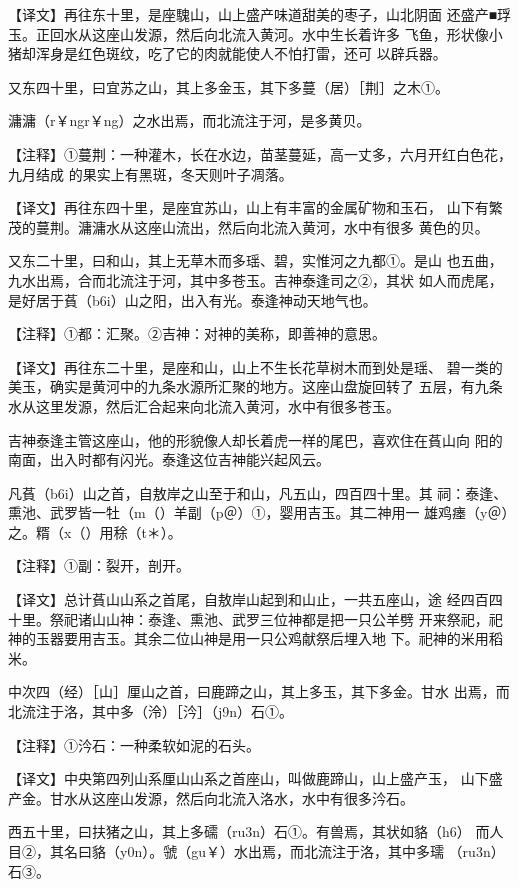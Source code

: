 \documentclass[a4paper,12pt,UTF8,twoside]{ctexbook}
\begin{document}
【译文】再往东十里，是座騩山，山上盛产味道甜美的枣子，山北阴面 还盛产■琈玉。正回水从这座山发源，然后向北流入黄河。水中生长着许多 飞鱼，形状像小猪却浑身是红色斑纹，吃了它的肉就能使人不怕打雷，还可 以辟兵器。

又东四十里，曰宜苏之山，其上多金玉，其下多蔓（居）［荆］之木①。

滽滽（r￥ngr￥ng）之水出焉，而北流注于河，是多黄贝。

【注释】①蔓荆：一种灌木，长在水边，苗茎蔓延，高一丈多，六月开红白色花，九月结成 的果实上有黑斑，冬天则叶子凋落。

【译文】再往东四十里，是座宜苏山，山上有丰富的金属矿物和玉石， 山下有繁茂的蔓荆。滽滽水从这座山流出，然后向北流入黄河，水中有很多 黄色的贝。

又东二十里，曰和山，其上无草木而多瑶、碧，实惟河之九都①。是山 也五曲，九水出焉，合而北流注于河，其中多苍玉。吉神泰逢司之②，其状 如人而虎尾，是好居于萯（b6i）山之阳，出入有光。泰逢神动天地气也。

【注释】①都：汇聚。②吉神：对神的美称，即善神的意思。

【译文】再往东二十里，是座和山，山上不生长花草树木而到处是瑶、 碧一类的美玉，确实是黄河中的九条水源所汇聚的地方。这座山盘旋回转了 五层，有九条水从这里发源，然后汇合起来向北流入黄河，水中有很多苍玉。

吉神泰逢主管这座山，他的形貌像人却长着虎一样的尾巴，喜欢住在萯山向 阳的南面，出入时都有闪光。泰逢这位吉神能兴起风云。

凡萯（b6i）山之首，自敖岸之山至于和山，凡五山，四百四十里。其 祠：泰逢、熏池、武罗皆一牡（m（）羊副（p＠）①，婴用吉玉。其二神用一 雄鸡瘗（y＠）之。糈（x（）用稌（t＊）。

【注释】①副：裂开，剖开。

【译文】总计萯山山系之首尾，自敖岸山起到和山止，一共五座山，途 经四百四十里。祭祀诸山山神：泰逢、熏池、武罗三位神都是把一只公羊劈 开来祭祀，祀神的玉器要用吉玉。其余二位山神是用一只公鸡献祭后埋入地 下。祀神的米用稻米。

中次四（经）［山］厘山之首，曰鹿蹄之山，其上多玉，其下多金。甘水 出焉，而北流注于洛，其中多（泠）［汵］（j9n）石①。

【注释】①汵石：一种柔软如泥的石头。

【译文】中央第四列山系厘山山系之首座山，叫做鹿蹄山，山上盛产玉， 山下盛产金。甘水从这座山发源，然后向北流入洛水，水中有很多汵石。

西五十里，曰扶猪之山，其上多礝（ru3n）石①。有兽焉，其状如貉（h6） 而人目②，其名曰貉（y0n）。虢（gu￥）水出焉，而北流注于洛，其中多瓀 （ru3n）石③。
\end{document}
